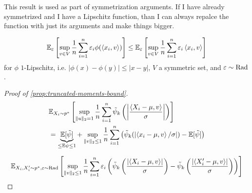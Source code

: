 This result is used as part of symmetrization arguments. If I have already symmetrized and I have
a Lipschitz function, than I can always repalce the function with just its
arguments and make things bigger.

\begin{theorem}
  \begin{align}
    \mathbb{E}_{\varepsilon}\left[
      \sup_{v \in V} \frac{1}{n} \sum^{n}_{i=1} \varepsilon_i \phi(\braket{x_i, v})
    \right]
    \leq \mathbb{E}_\varepsilon\left[
      \sup_{v \in V} \frac{1}{n} \sum_{i=1}^n \varepsilon_i \braket{x_i, v}
    \right]
  \end{align}
  for $\phi$ $1$-Lipschitz, i.e. $\vert \phi(x) - \phi(y) \rvert \leq \lvert x - y \rvert$,
  $V$ a symmetric set, and $\varepsilon \sim \text{Rad}$.
\end{theorem}

\begin{proof}[Proof of \cref{prop:truncated-moments-bound}]
  \begin{align}
    &\mathbb{E}_{X_i \sim p^*}\left[
      \sup_{\|u\|_2 = 1} \frac{1}{n} \sum_{i=1}^n \tilde{\psi}_k\left(
        \left\lvert \frac{\braket{X_i - \mu, v}}{\sigma}\right\rvert
      \right)
    \right] \\
    &= \underbrace{\mathbb{E}[\tilde{\psi}]}_{\leq \mathbb{E}\psi \leq 1} + \sup_{\|v\|_2 \leq 1} \frac{1}{n} \sum^{n}_{i=1} \left(
      \tilde{\psi}_k(\lvert \braket{x_i - \mu, v} / \sigma \rvert) - \mathbb{E}[\tilde\psi]
    \right)
  \end{align}

  \begin{align}
    \mathbb{E}_{X_i, X_i' \sim p^*, \varepsilon \sim \text{Rad}}\left[
      \sup_{\|v\|_2 \leq 1} \frac{1}{n} \sum^{n}_{i=1}
      \varepsilon_i \left(
        \tilde{\psi}_k\left(\frac{\lvert \braket{X_i - \mu, v}\rvert}{\sigma}\right)
        -  \tilde{\psi}_k\left(\frac{\lvert \braket{X_i' - \mu, v}\rvert}{\sigma}\right)
      \right)
    \right]
  \end{align}
\end{proof}
